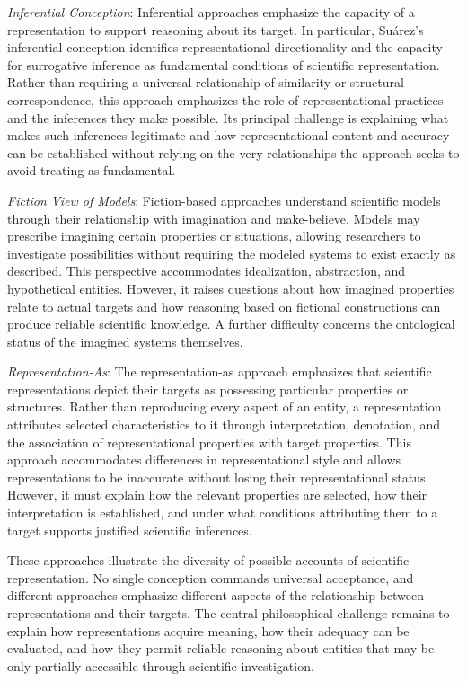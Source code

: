 \emph{Inferential Conception}: Inferential approaches emphasize the capacity of a representation to support reasoning about its target. In particular, Suárez's inferential conception identifies representational directionality and the capacity for surrogative inference as fundamental conditions of scientific representation. Rather than requiring a universal relationship of similarity or structural correspondence, this approach emphasizes the role of representational practices and the inferences they make possible. Its principal challenge is explaining what makes such inferences legitimate and how representational content and accuracy can be established without relying on the very relationships the approach seeks to avoid treating as fundamental.

\emph{Fiction View of Models}: Fiction-based approaches understand scientific models through their relationship with imagination and make-believe. Models may prescribe imagining certain properties or situations, allowing researchers to investigate possibilities without requiring the modeled systems to exist exactly as described. This perspective accommodates idealization, abstraction, and hypothetical entities. However, it raises questions about how imagined properties relate to actual targets and how reasoning based on fictional constructions can produce reliable scientific knowledge. A further difficulty concerns the ontological status of the imagined systems themselves.

\emph{Representation-As}: The representation-as approach emphasizes that scientific representations depict their targets as possessing particular properties or structures. Rather than reproducing every aspect of an entity, a representation attributes selected characteristics to it through interpretation, denotation, and the association of representational properties with target properties. This approach accommodates differences in representational style and allows representations to be inaccurate without losing their representational status. However, it must explain how the relevant properties are selected, how their interpretation is established, and under what conditions attributing them to a target supports justified scientific inferences.

These approaches illustrate the diversity of possible accounts of scientific representation. No single conception commands universal acceptance, and different approaches emphasize different aspects of the relationship between representations and their targets. The central philosophical challenge remains to explain how representations acquire meaning, how their adequacy can be evaluated, and how they permit reliable reasoning about entities that may be only partially accessible through scientific investigation.

